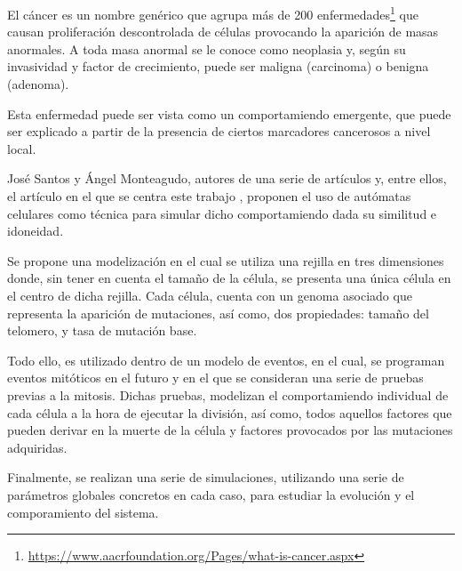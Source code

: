 El cáncer es un nombre genérico que agrupa más de 200 enfermedades\footnote{\url{https://www.aacrfoundation.org/Pages/what-is-cancer.aspx}} 
que causan proliferación descontrolada de células provocando la aparición de masas anormales. A toda masa anormal se
le conoce como neoplasia y, según su invasividad y factor de crecimiento, puede ser maligna (carcinoma) o benigna (adenoma).

Esta enfermedad puede ser vista como un comportamiendo emergente, que puede ser explicado a
partir de la presencia de ciertos marcadores cancerosos a nivel local.

José Santos y Ángel Monteagudo, autores de una serie de artículos y, entre ellos, el artículo
en el que se centra este trabajo \cite{jsantos-amonteagudo-1-2014}, proponen el uso de autómatas
celulares como técnica para simular dicho comportamiendo dada su similitud e idoneidad.

Se propone una modelización en el cual se utiliza una rejilla en tres dimensiones donde, sin
tener en cuenta el tamaño de la célula, se presenta una única célula en el centro de dicha
rejilla. Cada célula, cuenta con un genoma asociado que representa la aparición de mutaciones,
así como, dos propiedades: tamaño del telomero, y tasa de mutación base.

Todo ello, es utilizado dentro de un modelo de eventos, en el cual, se programan eventos mitóticos
en el futuro y en el que se consideran una serie de pruebas previas a la mitosis. Dichas pruebas,
modelizan el comportamiendo individual de cada célula a la hora de ejecutar la división, así como,
todos aquellos factores que pueden derivar en la muerte de la célula y factores provocados
por las mutaciones adquiridas.

Finalmente, se realizan una serie de simulaciones, utilizando una serie de parámetros globales
concretos en cada caso, para estudiar la evolución y el comporamiento del sistema.
